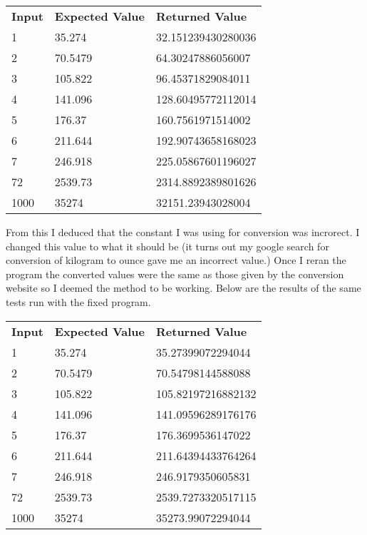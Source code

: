 \documentclass[a4paper]{article}
\begin{document}
\begin{table}[!h]
\begin{tabular}{lll}
\textbf{Input} & \textbf{Expected Value} & \textbf{Returned Value} \\
1              & 35.274                  & 32.151239430280036      \\
2              & 70.5479                 & 64.30247886056007       \\
3              & 105.822                 & 96.45371829084011       \\
4              & 141.096                 & 128.60495772112014      \\
5              & 176.37                  & 160.7561971514002       \\
6              & 211.644                 & 192.90743658168023      \\
7              & 246.918                 & 225.05867601196027      \\
72             & 2539.73                 & 2314.8892389801626      \\
1000           & 35274                   & 32151.23943028004      
\end{tabular}
\end{table}

From this I deduced that the constant I was using for conversion was incrorect. I changed this value to what it should be (it turns out my google 
search for conversion of kilogram to ounce gave me an incorrect value.) Once I reran the program the converted values were the same as those given by 
the conversion website so I deemed the method to be working. Below are the results of the same tests run with the fixed program.

\begin{table}[!h]
\begin{tabular}{lll}
\textbf{Input} & \textbf{Expected Value} & \textbf{Returned Value} \\
1              & 35.274                  & 35.27399072294044       \\
2              & 70.5479                 & 70.54798144588088       \\
3              & 105.822                 & 105.82197216882132      \\
4              & 141.096                 & 141.09596289176176      \\
5              & 176.37                  & 176.3699536147022       \\
6              & 211.644                 & 211.64394433764264      \\
7              & 246.918                 & 246.9179350605831       \\
72             & 2539.73                 & 2539.7273320517115      \\
1000           & 35274                   & 35273.99072294044      
\end{tabular}
\end{table}
\end{document}
